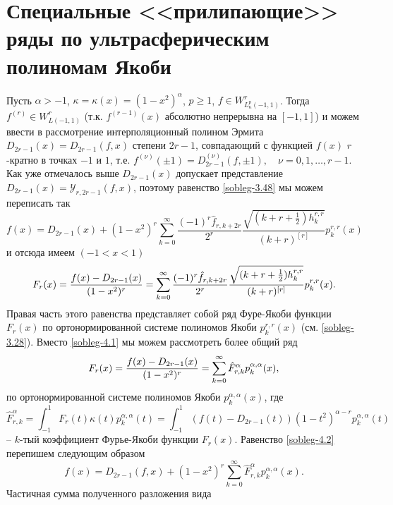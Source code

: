 \section{Специальные <<прилипающие>> ряды по ультрасферическим полиномам Якоби}\label{sobleg5}
Пусть $\alpha>-1$, $\kappa=\kappa(x)=(1-x^2)^\alpha$, $p\ge1$, $f\in W^r_{L^p_\kappa(-1,1)}$. Тогда $f^{(r)}\in W^r_{L(-1,1)}$ (т.к. $f^{(r-1)}(x)$ абсолютно непрерывна на $[-1,1]$) и можем ввести в рассмотрение интерполяционный полином Эрмита $D_{2r-1}(x)=D_{2r-1}(f,x)$ степени $2r-1$,  совпадающий с функцией $f(x)$ $r$-кратно в точках $-1$ и $1$, т.е. $f^{(\nu)}(\pm1)=D_{2r-1}^{(\nu)}(f,\pm1),\quad \nu=0,1,\ldots, r-1$. Как уже отмечалось выше  $D_{2r-1}(x)$ допускает представление $D_{2r-1}(x)=\mathcal{ Y}_{r,2r-1}(f,x)$, поэтому равенство \eqref{sobleg-3.48} мы можем переписать так
\begin{equation*}
f(x)=D_{2r-1}(x)+
(1-x^2)^r\sum_{k=0}^\infty\frac{(-1)^r\hat f_{r,k+2r}}{2^r} \frac{\sqrt{(k+r+\frac12)h_k^{r,r}}}{ (k+r)^{[r]}}p_{k}^{r,r}(x)
 \end{equation*}
 и отсюда имеем $(-1<x<1)$
\begin{equation}\label{sobleg-4.1}
F_r(x)={f(x)-D_{2r-1}(x)\over(1-x^2)^r}=
 \sum_{k=0}^\infty\frac{(-1)^r\hat f_{r,k+2r}}{2^r} \frac{\sqrt{(k+r+\frac12)h_k^{r,r}}}{ (k+r)^{[r]}}p_{k}^{r,r}(x).
\end{equation}
Правая часть этого равенства представляет собой ряд Фуре-Якоби функции $F_r(x)$ по ортонормированной системе полиномов Якоби $p_k^{r,r}(x)$ (см. \eqref{sobleg-3.28}). Вместо \eqref{sobleg-4.1} мы можем рассмотреть более общий ряд
\begin{equation}\label{sobleg-4.2}
F_r(x)={f(x)-D_{2r-1}(x)\over(1-x^2)^r}=
 \sum_{k=0}^\infty \hat F_{r,k}^\alpha p_{k}^{\alpha,\alpha}(x),
\end{equation}
по ортонормированной системе полиномов Якоби $p_{k}^{\alpha,\alpha}(x)$, где
\begin{equation}\label{sobleg-4.3}
\hat F^\alpha_{r,k}=\int_{-1}^1F_r(t)\kappa(t) p_{k}^{\alpha,\alpha}(t)=\int_{-1}^1(f(t)-D_{2r-1}(t))(1-t^2)^{\alpha-r} p_{k}^{\alpha,\alpha}(t)
\end{equation}
-- $k$-тый коэффициент Фурье-Якоби функции $F_r(x)$. Равенство \eqref{sobleg-4.2} перепишем следующим образом
\begin{equation}\label{sobleg-4.4}
f(x)=D_{2r-1}(f,x)+(1-x^2)^r \sum_{k=0}^\infty \hat F^\alpha_{r,k}p_{k}^{\alpha,\alpha}(x).
\end{equation}
Частичная сумма полученного разложения вида
